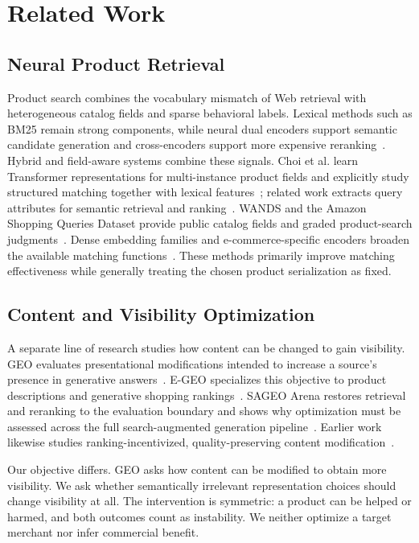 \section{Related Work}

\subsection{Neural Product Retrieval}

Product search combines the vocabulary mismatch of Web retrieval with heterogeneous catalog fields and sparse behavioral labels. Lexical methods such as BM25 remain strong components, while neural dual encoders support semantic candidate generation and cross-encoders support more expensive reranking~\cite{robertson2009bm25,reimers2019sentencebert,karpukhin2020dpr,nogueira2019passage}. Hybrid and field-aware systems combine these signals. Choi et al. learn Transformer representations for multi-instance product fields and explicitly study structured matching together with lexical features~\cite{choi2020semantic}; related work extracts query attributes for semantic retrieval and ranking~\cite{loughnane2024attributes}. WANDS and the Amazon Shopping Queries Dataset provide public catalog fields and graded product-search judgments~\cite{chen2022wands,reddy2022shopping}. Dense embedding families and e-commerce-specific encoders broaden the available matching functions~\cite{xiao2024cpack,li2023gte}. These methods primarily improve matching effectiveness while generally treating the chosen product serialization as fixed.

\subsection{Content and Visibility Optimization}

A separate line of research studies how content can be changed to gain visibility. GEO evaluates presentational modifications intended to increase a source's presence in generative answers~\cite{aggarwal2024geo}. E-GEO specializes this objective to product descriptions and generative shopping rankings~\cite{bagga2025egeo}. SAGEO Arena restores retrieval and reranking to the evaluation boundary and shows why optimization must be assessed across the full search-augmented generation pipeline~\cite{kim2026sageo}. Earlier work likewise studies ranking-incentivized, quality-preserving content modification~\cite{goren2020ranking}.

Our objective differs. GEO asks how content can be modified to obtain more visibility. We ask whether semantically irrelevant representation choices should change visibility at all. The intervention is symmetric: a product can be helped or harmed, and both outcomes count as instability. We neither optimize a target merchant nor infer commercial benefit.

